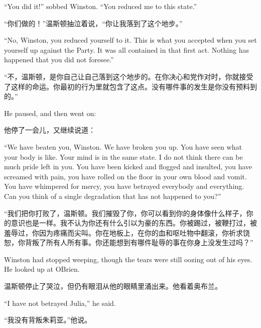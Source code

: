 \begin{paracol}{2}
``You did it!'' sobbed Winston. ``You reduced me to this state.''

\switchcolumn

``你们做的！''温斯顿抽泣着说，``你让我落到了这个地步。''

\switchcolumn*

``No, Winston, you reduced yourself to it. This is what you accepted when
you set yourself up against the Party. It was all contained in that
first act. Nothing has happened that you did not foresee.''

\switchcolumn

``不，温斯顿，是你自己让自己落到这个地步的。在你决心和党作对时，你就接受了这样的命运。你最初的行为里就包含了这点。没有哪件事的发生是你没有预料到的。''

\switchcolumn*

He paused, and then went on:

\switchcolumn

他停了一会儿，又继续说道：

\switchcolumn*

``We have beaten you, Winston. We have broken you up. You have seen what
your body is like. Your mind is in the same state. I do not think there
can be much pride left in you. You have been kicked and flogged and
insulted, you have screamed with pain, you have rolled on the floor in
your own blood and vomit. You have whimpered for mercy, you have
betrayed everybody and everything. Can you think of a single degradation
that has not happened to you?''

\switchcolumn

``我们把你打败了，温斯顿。我们摧毁了你，你可以看到你的身体像什么样子，你的意识也是一样。我不认为你还有什么引以为豪的东西。你被踢过，被鞭打过，被羞辱过，你因为疼痛而尖叫。你在地板上，在你的血和呕吐物中翻滚，你祈求饶恕，你背叛了所有人所有事。你还能想到有哪件耻辱的事在你身上没发生过吗？''

\switchcolumn*

Winston had stopped weeping, though the tears were still oozing out of
his eyes. He looked up at O\textquotesingle Brien.

\switchcolumn

温斯顿停止了哭泣，但仍有眼泪从他的眼睛里涌出来。他看着奥布兰。

\switchcolumn*

``I have not betrayed Julia,'' he said.

\switchcolumn

``我没有背叛朱莉亚。''他说。


\end{paracol}
